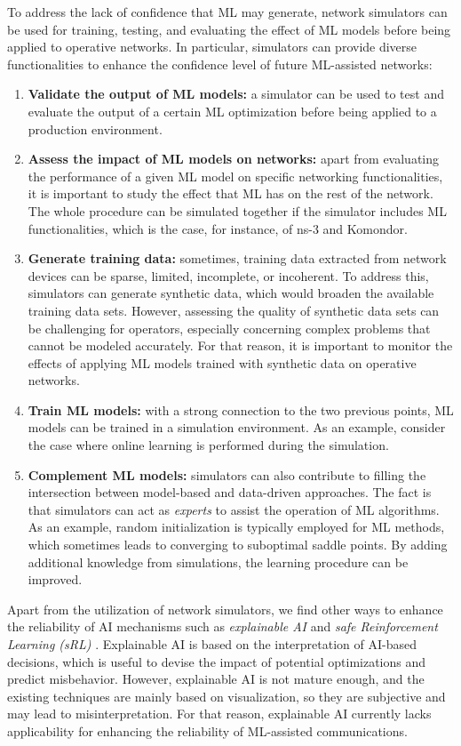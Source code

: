 \documentclass{article}
\begin{document}
	To address the lack of confidence that ML may generate, network simulators can be used for training, testing, and evaluating the effect of ML models before being applied to operative networks. In particular, simulators can provide diverse functionalities to enhance the confidence level of future ML-assisted networks: 
	\begin{enumerate}
		\item \textbf{Validate the output of ML models:} a simulator can be used to test and evaluate the output of a certain ML optimization before being applied to a production environment. 
		\item \textbf{Assess the impact of ML models on networks:} apart from evaluating the performance of a given ML model on specific networking functionalities, it is important to study the effect that ML has on the rest of the network. The whole procedure can be simulated together if the simulator includes ML functionalities, which is the case, for instance, of ns-3 and Komondor.
		\item \textbf{Generate training data:} sometimes, training data extracted from network devices can be sparse, limited, incomplete, or incoherent. To address this, simulators can generate synthetic data, which would broaden the available training data sets. However, assessing the quality of synthetic data sets can be challenging for operators, especially concerning complex problems that cannot be modeled accurately. For that reason, it is important to monitor the effects of applying ML models trained with synthetic data on operative networks.
		\item \textbf{Train ML models:} with a strong connection to the two previous points, ML models can be trained in a simulation environment. As an example, consider the case where online learning is performed during the simulation.
		\item \textbf{Complement ML models:} simulators can also contribute to filling the intersection between model-based and data-driven approaches. The fact is that simulators can act as \textit{experts} to assist the operation of ML algorithms. As an example, random initialization is typically employed for ML methods, which sometimes leads to converging to suboptimal saddle points. By adding additional knowledge from simulations, the learning procedure can be improved.
	\end{enumerate}

	Apart from the utilization of network simulators, we find other ways to enhance the reliability of AI mechanisms such as \textit{explainable AI} \cite{samek} and \textit{safe Reinforcement Learning (sRL)} \cite{safe}. Explainable AI is based on the interpretation of AI-based decisions, which is useful to devise the impact of potential optimizations and predict misbehavior. However, explainable AI is not mature enough, and the existing techniques are mainly based on visualization, so they are subjective and may lead to misinterpretation. For that reason, explainable AI currently lacks applicability for enhancing the reliability of ML-assisted communications. 
	
\end{document}
